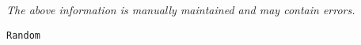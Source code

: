 \label{pkg:random}

{\tiny \it The above information is manually maintained and may contain errors.}
\begin{verbatim}
Random
\end{verbatim}
